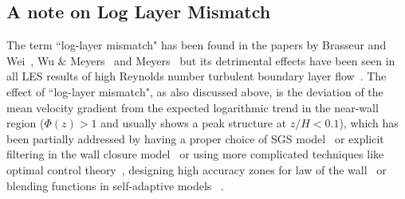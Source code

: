\subsection{A note on Log Layer Mismatch}\label{lotw}
The term ``log-layer mismatch" has been found in the papers by Brasseur {and Wei}~\cite{brass},  Wu $\&$ Meyers~\cite{meyers_err} and Meyers~\cite{meyers2} but {its} detrimental effects have been seen in all LES results of high Reynolds number turbulent boundary layer flow~\cite{sull,pio2,porte1fun,bou1,chow,temp2}. The effect of ``log-layer mismatch", as also discussed above, is the deviation of the mean velocity gradient from the expected logarithmic trend in the near-wall region ($\Phi(z) > 1$ and usually shows a peak structure at $z/H < 0.1$), which has been partially addressed by having a proper choice of SGS model~\cite{mason,porte1fun,bou1} or explicit filtering in the wall closure model~\cite{bou1,meyers_err,meyers2} or using more complicated techniques like optimal control theory~\cite{temp2}, designing high accuracy zones for law of {the} wall~\cite{brass} or blending functions in self-adaptive models~\cite{meyers2} .
